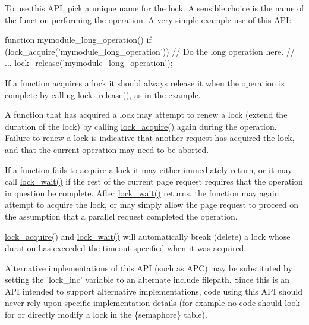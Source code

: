 To use this API, pick a unique name for the lock. A sensible choice is the name of the function performing the operation. A very simple example use of this API: 
\begin{DoxyCode}
 function mymodule_long_operation() {
   if (lock_acquire('mymodule_long_operation')) {
     // Do the long operation here.
     // ...
     lock_release('mymodule_long_operation');
   }
 }
\end{DoxyCode}


If a function acquires a lock it should always release it when the operation is complete by calling \hyperlink{group__lock_ga73e1456861f9aff1a506a650f43aceb0}{lock\_\-release()}, as in the example.

A function that has acquired a lock may attempt to renew a lock (extend the duration of the lock) by calling \hyperlink{group__lock_gac67a4b1061491f7a869646f47b66e998}{lock\_\-acquire()} again during the operation. Failure to renew a lock is indicative that another request has acquired the lock, and that the current operation may need to be aborted.

If a function fails to acquire a lock it may either immediately return, or it may call \hyperlink{group__lock_ga54c2ee771edac47614b8f12d949d3376}{lock\_\-wait()} if the rest of the current page request requires that the operation in question be complete. After \hyperlink{group__lock_ga54c2ee771edac47614b8f12d949d3376}{lock\_\-wait()} returns, the function may again attempt to acquire the lock, or may simply allow the page request to proceed on the assumption that a parallel request completed the operation.

\hyperlink{group__lock_gac67a4b1061491f7a869646f47b66e998}{lock\_\-acquire()} and \hyperlink{group__lock_ga54c2ee771edac47614b8f12d949d3376}{lock\_\-wait()} will automatically break (delete) a lock whose duration has exceeded the timeout specified when it was acquired.

Alternative implementations of this API (such as APC) may be substituted by setting the 'lock\_\-inc' variable to an alternate include filepath. Since this is an API intended to support alternative implementations, code using this API should never rely upon specific implementation details (for example no code should look for or directly modify a lock in the \{semaphore\} table). 

